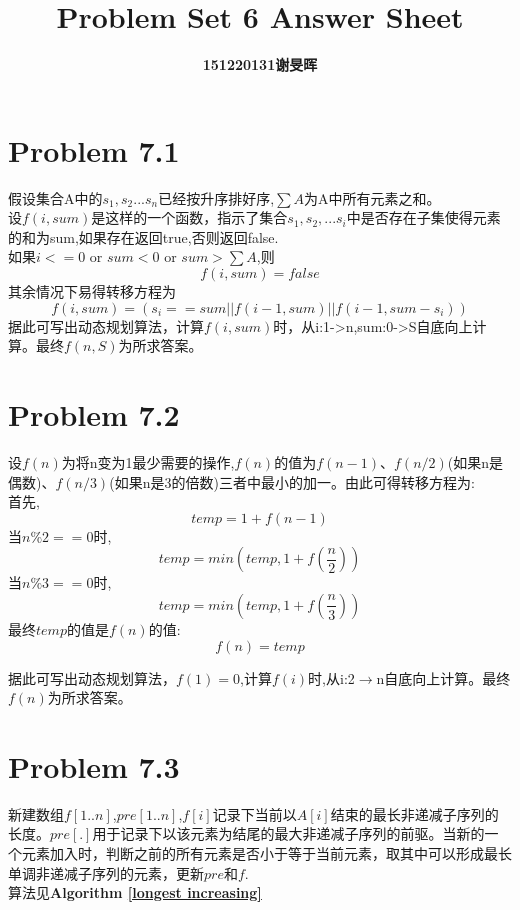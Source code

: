 \documentclass[onecolumn]{ctexart}
\begin{document}
	\title{Problem Set 6 Answer Sheet}
	\author{\textbf{151220131谢旻晖}}
	\date{}
	\maketitle



\section*{Problem 7.1}
\indent 假设集合A中的$s_1,s_2...s_n$已经按升序排好序,$\sum A$为A中所有元素之和。\\
\indent 设$f(i,sum)$是这样的一个函数，指示了集合{$s_1,s_2,...s_i$}中是否存在子集使得元素的和为sum,如果存在返回true,否则返回false.\\

%
\indent 如果$i<=0$ or $sum<0$ or $sum>\sum A$,则
\[f(i,sum)=false\]
\indent 其余情况下易得转移方程为
\[f(i,sum)=\left(s_i==sum||f(i-1,sum)||f(i-1,sum-s_i)\right)\]
\indent 据此可写出动态规划算法，计算$f(i,sum)$时，从i:1->n,sum:0->S自底向上计算。最终$f(n,S)$为所求答案。\\

\section*{Problem 7.2}
\indent 设$f(n)$为将n变为1最少需要的操作,$f(n)$的值为$f(n-1)$、$f(n/2)$(如果n是偶数)、$f(n/3)$(如果n是3的倍数)三者中最小的加一。由此可得转移方程为:\\
首先,
 \[temp=1+f(n-1)\]
当$n\%2==0$时,
		\[temp=min(temp,1+f(\frac{n}{2}))\]
当$n\%3==0$时,
\[temp=min(temp,1+f(\frac{n}{3}))\]
最终$temp$的值是$f(n)$的值:
\[f(n)=temp\]

\indent 据此可写出动态规划算法，$f(1)=0$,计算$f(i)$时,从i:2$\rightarrow$n自底向上计算。最终$f(n)$为所求答案。\\

\section*{Problem 7.3}
\indent 新建数组$f[1..n]$,$pre[1..n]$,$f[i]$记录下当前以$A[i]$结束的最长非递减子序列的长度。$pre[.]$用于记录下以该元素为结尾的最大非递减子序列的前驱。当新的一个元素加入时，判断之前的所有元素是否小于等于当前元素，取其中可以形成最长单调非递减子序列的元素，更新$pre$和$f$.\\
\indent 算法见\textbf{Algorithm \ref{longest increasing}}
\end{document}
